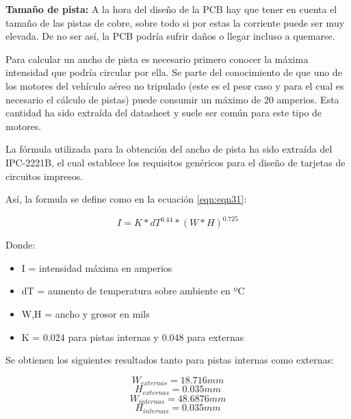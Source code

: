 \textbf{Tamaño de pista: } \newline
A la hora del diseño de la PCB hay que tener en cuenta el tamaño de las pistas de cobre, sobre todo si por estas la corriente puede ser muy elevada. De no ser así, la PCB podría sufrir daños o llegar incluso a quemarse. \newline

Para calcular un ancho de pista es necesario primero conocer la máxima intensidad que podría circular por ella. Se parte del conocimiento de que uno de los motores del vehículo aéreo no tripulado (este es el peor caso y para el cual es necesario el cálculo de pistas) puede consumir un máximo de 20 amperios. Esta cantidad ha sido extraída del datasheet y suele ser común para este tipo de motores. \newline

La fórmula utilizada para la obtención del ancho de pista ha sido extraída del IPC-2221B, el cual establece los requisitos genéricos para el diseño de tarjetas de circuitos impresos. \newline

Así, la formula se define como en la ecuación \ref{eqn:eqn31}: 

\begin{equation}
I = K * dT^{0.44}*(W*H)^{0.725}
\label{eqn:eqn31}
\end{equation}

Donde: 
\begin{itemize}
	\item I = intensidad máxima en amperios
	\item dT = aumento de temperatura sobre ambiente en ºC
	\item W,H = ancho y grosor en mils
	\item K = 0.024 para pistas internas y 0.048 para externas
\end{itemize}

Se obtienen los siguientes resultados tanto para pistas internas como externas: 

\begin{equation*}
W_{externas} = 18.716 mm 
\end{equation*} 
\begin{equation*}
H_{externas} = 	0.035 mm
\end{equation*}
\begin{equation*}
W_{internas} =  48.6876 mm 
\end{equation*} 
\begin{equation*}
H_{internas} = 	0.035 mm
\end{equation*}

